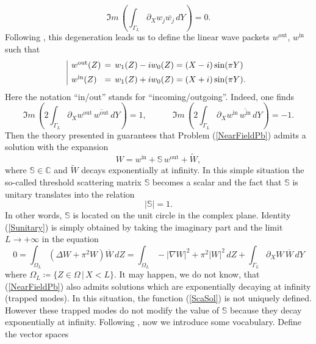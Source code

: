 \documentclass[11pt,a4paper]{article}
\newcommand{\Om}{\Omega}
\newcommand{\mrm}[1]{\mathrm{#1}}
\newcommand{\Cplx}{\mathbb{C}}
\begin{document}
\[
\Im m\,\left(\int_{\Gamma_L}\partial_Xw_j\overline{w_j}\,dY\right)=0.
\]
Following \cite[Chap.\,5]{NaPl94}, this degeneration leads us to define the linear wave packets $w^{\mrm{out}}$, $w^{\mrm{in}}$ such that
\begin{equation}\label{defModeswinout}
\begin{array}{|lcl}
w^{\mrm{out}}(Z) &\hspace{-0.2cm}=& \hspace{-0.2cm}w_1(Z)- iw_0(Z) =(X- i)\sin(\pi Y)\\[5pt]
w^{\mrm{in}}(Z) &\hspace{-0.2cm}=& \hspace{-0.2cm}w_1(Z)+ iw_0(Z) =(X+ i)\sin(\pi Y).
\end{array}
\end{equation}
Here the notation ``in/out'' stands for ``incoming/outgoing''. Indeed, one finds
\[
\Im m\,\left(2\int_{\Gamma_L}\partial_Xw^{\mrm{out}}\,\overline{w^{\mrm{out}}}\,dY\right)=1,\qquad\quad \Im m\,\left(2\int_{\Gamma_L}\partial_Xw^{\mrm{in}}\,\overline{w^{\mrm{in}}}\,dY\right)=-1.
\]
Then the theory presented in \cite[Chap.\,5]{NaPl94} guarantees that Problem (\ref{NearFieldPb}) admits a solution with the expansion
\begin{equation}\label{ScaSol}
W  = w^{\mrm{in}}+\mathbb{S}\,w^{\mrm{out}}+\widetilde{W},
\end{equation}
where $\mathbb{S}\in\Cplx$ and $\widetilde{W}$ decays exponentially at infinity. In this simple situation the so-called threshold scattering matrix $\mathbb{S}$ becomes a scalar and the fact that $\mathbb{S}$ is unitary translates into the relation 
\begin{equation}\label{Sunitary}
|\mathbb{S}|=1.
\end{equation}
In other words, $\mathbb{S}$ is located on the unit circle in the complex plane. Identity (\ref{Sunitary}) is simply obtained by taking the imaginary part and the limit $L\to+\infty$ in the equation
\[
0=\int_{\Om_L}(\Delta W+\pi^2 W)\overline{W}\,dZ=\int_{\Om_L}-|\nabla W|^2+\pi^2|W|^2\,dZ+\int_{\Gamma_L}\partial_XW\,\overline{W}\,dY
\]
where $\Om_L\coloneqq\{Z\in\Om\,|\,X<L\}$. It may happen, we do not know, that (\ref{NearFieldPb}) also admits solutions which are exponentially decaying at infinity (trapped modes). In this situation, the function (\ref{ScaSol}) is not uniquely defined. However these trapped modes do not modify the value of $\mathbb{S}$ because they decay exponentially at infinity. Following \cite{MoVa08,Naza17bis,KoNS16,Naza20Threshold}, now we introduce some vocabulary. Define the vector spaces
\end{document}
